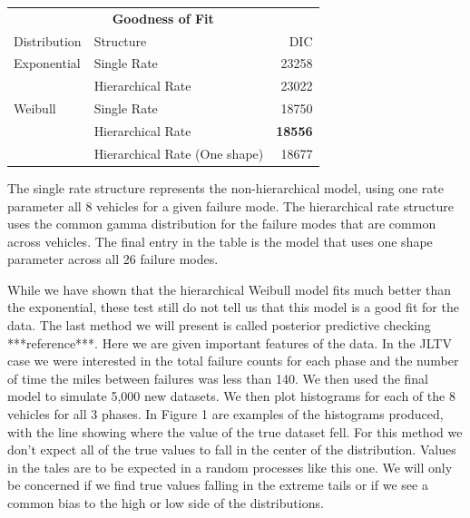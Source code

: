 \documentclass[12pt]{article}
\begin{document}
\begin{tabular}{|l|l|r|}
\multicolumn{3}{c}{\textbf{Goodness of Fit}} \\
\cline{1-3}
Distribution    & Structure & DIC \\
\hline
Exponential   & Single Rate                       & 23258               \\
              & Hierarchical Rate                 & 23022               \\
Weibull       & Single Rate                       & 18750               \\
              & Hierarchical Rate                 & \textbf{18556}      \\
              & Hierarchical Rate (One shape)     & 18677               \\
\hline
\end{tabular}

The single rate structure represents the non-hierarchical model, using one rate
parameter all 8 vehicles for a given failure mode.  The hierarchical rate
structure uses the common gamma distribution for the failure modes that are
common across vehicles.  The final entry in the table is the model that uses one
shape parameter across all 26 failure modes.

While we have shown that the hierarchical Weibull model fits much better than
the exponential, these test still do not tell us that this model is a good fit
for the data.  The last method we will present is called posterior predictive
checking ***reference***.  Here we are given important features of the data.
In the JLTV case we were interested in the total failure counts for each phase
and the number of time the miles between failures was less than 140.  We then
used the final model to simulate 5,000 new datasets.  We then plot histograms
for each of the 8 vehicles for all 3 phases.  In Figure 1 are examples of the
histograms produced, with the line showing where the value of the true dataset
fell.  For this method we don’t expect all of the true values to fall in the
center of the distribution.  Values in the tales are to be expected in a random
processes like this one.  We will only be concerned if we find true values
falling in the extreme tails or if we see a common bias to the high or low side
of the distributions.
\end{document}
